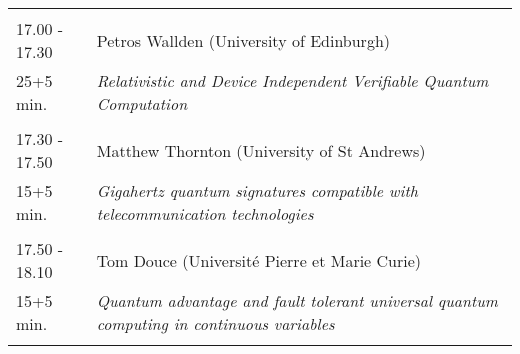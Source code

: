 \begin{longtable}{p{3cm}p{13cm}}
 & \\ 
17.00 - 17.30 & Petros Wallden (University of Edinburgh)\\ 
25+5 min. & {\it Relativistic and Device Independent Verifiable Quantum Computation}\\ 
 & \\ 
17.30 - 17.50 & Matthew Thornton (University of St Andrews)\\ 
15+5 min. & {\it Gigahertz quantum signatures compatible with telecommunication technologies}\\ 
 & \\ 
17.50 - 18.10 & Tom Douce (Université Pierre et Marie Curie)\\ 
15+5 min. & {\it Quantum advantage and fault tolerant universal quantum computing in continuous variables}\\ 
 & \\ 
\end{longtable}

